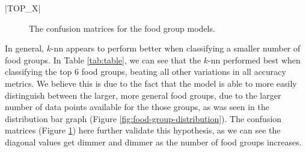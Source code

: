 \documentclass[11pt]{article}
\begin{document}
|TOP_X|
\begin{figure}[htbp]
    \centering
    \qquad
    \qquad
    \caption{The confusion matrices for the \protect{} food group models.}
    \label{fig:confusion-matrices}
\end{figure}

In general, $k$-nn appears to perform better when classifying a smaller number of food groups. In Table \ref{tab:table}, we can see that the $k$-nn performed best when classifying the top 6 food groups, beating all other variations in all accuracy metrics. We believe this is due to the fact that the model is able to more easily distinguish between the larger, more general food groups, due to the larger number of data points available for the those groups, as was seen in the distribution bar graph (Figure \ref{fig:food-group-distribution}). The confusion matrices (Figure \ref{fig:confusion-matrices}) here further validate this hypothesis, as we can see the diagonal values get dimmer and dimmer as the number of food groups increases.
\end{document}
